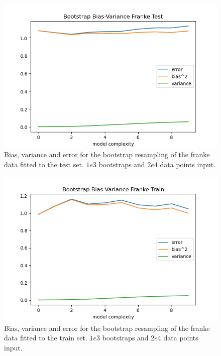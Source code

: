 \documentclass[12pt]{revtex4-2}
\begin{document}
\begin{figure}[hbtp]
\includegraphics[scale=0.7]{
	../plots/frankeBootstrapBiasVariancesigma1poly10boot1e3datapt2e4test.png}
\caption{
	Bias, variance and error for the bootstrap resampling of the franke data fitted to 
	the test set. $1e3$ bootstraps and $2e4$ data points input. 
	}
\label{fig:BootstrapBiasVariance2e4test}
\end{figure}

\begin{figure}[hbtp]
\includegraphics[scale=0.7]{
	../plots/frankeBootstrapBiasVariancesigma1poly10boot1e3datapt2e4train.png}
\caption{
	Bias, variance and error for the bootstrap resampling of the franke data fitted to 
	the train set. $1e3$ bootstraps and $2e4$ data points input. 
	}
\label{fig:BootstrapBiasVariance2e4train}
\end{figure}
\end{document}
